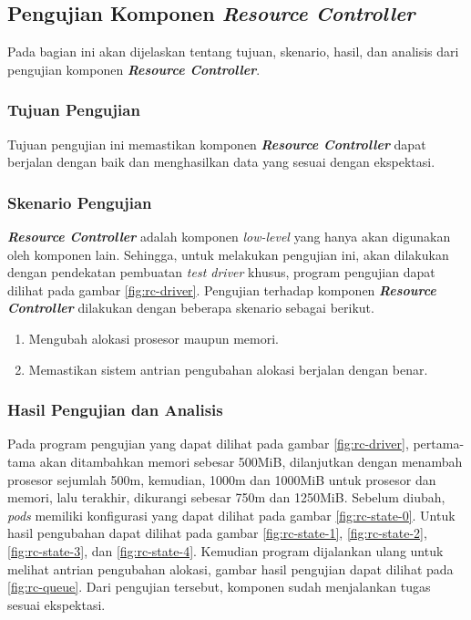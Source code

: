 \subsection{Pengujian Komponen \textit{Resource Controller}}

Pada bagian ini akan dijelaskan tentang tujuan, skenario, hasil, dan analisis dari pengujian komponen \textbf{\textit{Resource Controller}}.

\subsubsection{Tujuan Pengujian}

Tujuan pengujian ini memastikan komponen \textbf{\textit{Resource Controller}} dapat berjalan dengan baik dan menghasilkan data yang sesuai dengan ekspektasi.

\subsubsection{Skenario Pengujian}

\textbf{\textit{Resource Controller}} adalah komponen \textit{low-level} yang hanya akan digunakan oleh komponen lain. Sehingga, untuk melakukan pengujian ini, akan dilakukan dengan pendekatan pembuatan \textit{test driver} khusus, program pengujian dapat dilihat pada gambar \ref{fig:rc-driver}. Pengujian terhadap komponen \textbf{\textit{Resource Controller}} dilakukan dengan beberapa skenario sebagai berikut.
\begin{enumerate}
    \item Mengubah alokasi prosesor maupun memori.
    \item Memastikan sistem antrian pengubahan alokasi berjalan dengan benar.
\end{enumerate}

\subsubsection{Hasil Pengujian dan Analisis}

Pada program pengujian yang dapat dilihat pada gambar \ref{fig:rc-driver}, pertama-tama akan ditambahkan memori sebesar 500MiB, dilanjutkan dengan menambah prosesor sejumlah 500m, kemudian, 1000m dan 1000MiB untuk prosesor dan memori, lalu terakhir, dikurangi sebesar 750m dan 1250MiB. Sebelum diubah, \textit{pods} memiliki konfigurasi yang dapat dilihat pada gambar \ref{fig:rc-state-0}. Untuk hasil pengubahan dapat dilihat pada gambar \ref{fig:rc-state-1}, \ref{fig:rc-state-2}, \ref{fig:rc-state-3}, dan \ref{fig:rc-state-4}. Kemudian program dijalankan ulang untuk melihat antrian pengubahan alokasi, gambar hasil pengujian dapat dilihat pada \ref{fig:rc-queue}. Dari pengujian tersebut, komponen sudah menjalankan tugas sesuai ekspektasi.

